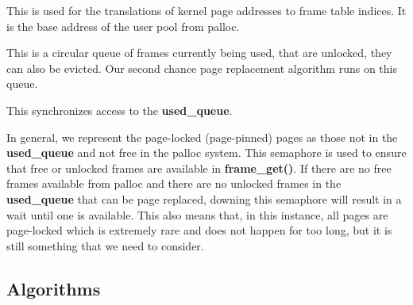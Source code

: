 \documentclass{report}
\newcommand{\fun}[1]{\textcolor{Emerald}{\textbf{#1}}}
\newcommand{\file}[1]{\textcolor{YellowGreen}{\textbf{#1}}}
\newcommand{\var}[1]{\textcolor{RoyalPurple}{\textbf{#1}}}
\newcommand{\pintoscode}[4]{}
\newcommand{\pintosfile}[3]{\pintoscode{#1}{#2}{\file{#3}}{#3}}
\begin{document}
				\pintosfile{41}{41}{frame.c}
				This is used for the translations of kernel page addresses to frame 
				table indices. It is the base address of the user pool from palloc.
				
				\pintosfile{53}{53}{frame.c}
				This is a circular queue of frames currently being used, that are 
				unlocked, they can also be evicted. Our second chance page replacement algorithm 
				runs on this queue.

				\pintosfile{44}{44}{frame.c}
				This synchronizes access to the \var{used\_queue}.

				\pintosfile{50}{50}{frame.c}
				In general, we represent the page-locked (page-pinned) pages as those
				not in the \var{used\_queue} and not free in the palloc system.
				This semaphore is used to ensure that free or unlocked frames are available in \fun{frame\_get()}.
				If there are no free frames available from palloc and there
				are no unlocked frames in the \var{used\_queue} that can be page replaced,
				downing this semaphore will result in a wait until one is available. This
				also means that, in this instance, all pages are page-locked which is extremely rare and does not
				happen for too long, but it is still something that we need to consider.
				

		\subsection*{Algorithms}
\end{document}
